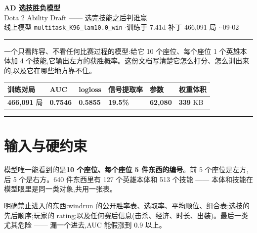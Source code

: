 \documentclass[11pt,a4paper]{article}
\begin{document}
\begin{center}
{\Huge\bfseries AD 选技胜负模型}\\[6pt]
{\large\color{mutedc} Dota 2 Ability Draft —— 选完技能之后判谁赢}\\[10pt]
{\small\color{mutedc} 线上模型 \texttt{multitask\_K96\_lam10.0\_win} \quad$\cdot$\quad 训练于 7.41d 补丁 466{,}091 局 \quad$\cdot$-09-02}
\end{center}

\vspace{4pt}
\noindent\rule{\textwidth}{1pt}
\vspace{6pt}

\noindent 一个只看阵容、不看任何比赛过程的模型:给它 10 个座位、每个座位 1 个英雄本体加 4 个技能,它输出左方的获胜概率。这份文档写清楚它怎么打分、怎么训出来的,以及它在哪些地方靠不住。

\vspace{8pt}
\begin{center}
\small
\begin{tabular}{@{}p{2.3cm}p{2.3cm}p{2.3cm}p{2.4cm}p{2.1cm}p{2.2cm}@{}}
\toprule
\color{mutedc}训练对局 & \color{mutedc}AUC & \color{mutedc}logloss & \color{mutedc}信号提取率 & \color{mutedc}参数 & \color{mutedc}权重体积\\
\midrule
\textbf{466,091} 局 & \textbf{0.7546} & \textbf{0.5855} & \textbf{19.5\%} & \textbf{62,080} & \textbf{339} KB\\
\bottomrule
\end{tabular}
\end{center}

\vspace{6pt}
\noindent\rule{\textwidth}{0.4pt}

\tableofcontents
\vspace{6pt}

\section{输入与硬约束}

模型唯一能看到的是\textbf{10 个座位、每个座位 5 件东西的编号}。前 5 个座位是左方,后 5 个是右方。640 件东西里有 127 个英雄本体和 513 个技能 —— 本体和技能在模型眼里是同一类对象,共用一张表。

明确禁止进入的东西:windrun 的公开胜率表、选取率、平均顺位、组合表;选技的先后顺序;玩家的 rating;以及任何赛后信息(击杀、经济、时长、出装)。最后一类尤其危险 —— 漏一个进去,AUC 能假涨到 0.9 以上。
\end{document}
